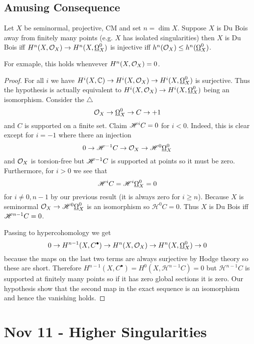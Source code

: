 \documentclass[12pt]{article}
\renewcommand{\cH}{\mathcal{H}}
\begin{document}
\subsection{Amusing Consequence}

\begin{cor}
Let $X$ be seminormal, projective, CM and set $n = \dim{X}$. Suppose $X$ is Du Bois away from finitely many points (e.g. $X$ has isolated singularities) then $X$ is Du Bois iff $H^n(X, \mathcal{O}_{X}) \to H^n(X, \underline{\Omega}_X^0)$ is injective iff $h^n(\mathcal{O}_{X}) \le h^n(\underline{\Omega}_X^0)$.
\end{cor}

For exmaple, this holds whenvever $H^n(X, \mathcal{O}_{X}) = 0$. 

\begin{proof}
For all $i$ we have $H^i(X, \mathbb{C}) \to H^i(X, \mathcal{O}_{X}) \to H^i(X, \underline{\Omega}_X^0)$ is surjective. Thus the hypothesis is actually equivalent to $H^i(X, \mathcal{O}_{X}) \to H^i(X, \underline{\Omega}_X^0)$ being an isomorphism. Consider the $\triangle$
\[ \mathcal{O}_{X} \to \underline{\Omega}_X^0 \to C \to +1 \]
and $C$ is supported on a finite set. Claim $\mathscr{H}^i C = 0$ for $i < 0$. Indeed, this is clear except for $i = -1$ where there an injection
\[ 0 \to \mathscr{H}^{-1} C \to \mathcal{O}_{X} \to \mathscr{H}^0 \underline{\Omega}_X^0 \]
and $\mathcal{O}_{X}$ is torsion-free but $\mathscr{H}^{-1} C$ is supported at points so it must be zero. Furthermore, for $i > 0$ we see that 
\[ \mathscr{H}^i C = \mathscr{H}^i \underline{\Omega}_X^0 = 0 \]
for $i \neq 0, n-1$ by our previous result (it is always zero for $i \ge n$). Because $X$ is seminormal $\mathcal{O}_{X} \to \mathscr{H}^0 \underline{\Omega}_X^0$ is an isomorphism so $\cH^0 C = 0$. Thus $X$ is Du Bois iff $\mathscr{H}^{n-1} C = 0$. 
\par 
Passing to hypercohomology we get
\[ 0 \to H^{n-1}(X, C^\bullet) \to H^n(X, \mathcal{O}_{X}) \to H^n(X, \underline{\Omega}_X^0) \to 0 \]
because the maps on the last two terms are always surjective by Hodge theory so these are short. Therefore $H^{n-1}(X, C^\bullet) = H^0(X, \cH^{n-1} C) = 0$ but $\cH^{n-1} C$ is supported at finitely many points so if it has zero global sections it is zero. Our hypothesis show that the second map in the exact sequence is an isomorphism and hence the vanishing holds. 
\end{proof}

\section{Nov 11 - Higher Singularities}
\end{document}
